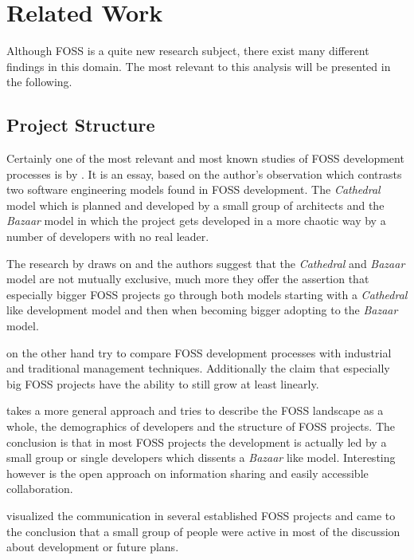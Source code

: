 \chapter{Related Work} %

Although \ac{FOSS} is a quite new research subject, there exist many different
findings in this domain. The most relevant to this analysis will be presented
in the following.

\section{Project Structure} %

Certainly one of the most relevant and most known studies of \ac{FOSS}
development processes is  by \textcite{Raymond1998}. It
is an essay, based on the author's observation which contrasts two software
engineering models found in \ac{FOSS} development. The \emph{Cathedral} model
which is planned and developed by a small group of architects and the
\emph{Bazaar} model in which the project gets developed in a more chaotic way
by a number of developers with no real leader.

The research by \textcite{Capiluppi2007} draws on  and
the authors suggest that the \emph{Cathedral} and \emph{Bazaar} model are not
mutually exclusive, much more they offer the assertion that especially bigger
\ac{FOSS} projects go through both models starting with a \emph{Cathedral} like
development model and then when becoming bigger adopting to the \emph{Bazaar}
model.

\textcite{Godfrey2000} on the other hand try to compare \ac{FOSS} development
processes with industrial and traditional management techniques. Additionally
the claim that especially big \ac{FOSS} projects have the ability to still grow
at least linearly.

\textcite{Kim2003} takes a more general approach and tries to describe the
\ac{FOSS} landscape as a whole, the demographics of developers and the
structure of \ac{FOSS} projects. The conclusion is that in most \ac{FOSS}
projects the development is actually led by a small group or single developers
which dissents a \emph{Bazaar} like model. Interesting however is the open
approach on information sharing and easily accessible collaboration.

\textcite{Ogawa2007} visualized the communication in several established
\ac{FOSS} projects and came to the conclusion that a small group of people were
active in most of the discussion about development or future plans.

